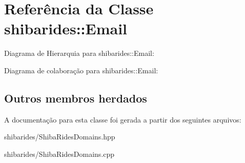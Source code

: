 \hypertarget{classshibarides_1_1Email}{}\section{Referência da Classe shibarides\+:\+:Email}
\label{classshibarides_1_1Email}


Diagrama de Hierarquia para shibarides\+:\+:Email\+:


Diagrama de colaboração para shibarides\+:\+:Email\+:
\subsection*{Outros membros herdados}


A documentação para esta classe foi gerada a partir dos seguintes arquivos\+:\begin{DoxyCompactItemize}
\item 
shibarides/Shiba\+Rides\+Domains.\+hpp\item 
shibarides/Shiba\+Rides\+Domains.\+cpp\end{DoxyCompactItemize}

